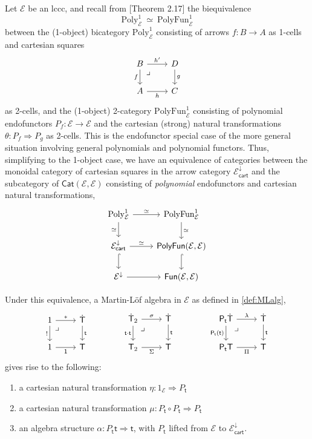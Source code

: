 \documentclass[12pt,reqno]{amsart}
\newcommand{\EE}{\ensuremath{\mathcal{E}}}
\newcommand{\Cat}{\ensuremath{\mathsf{Cat}}}
\newcommand{\alg}[1]{\ensuremath{\mathsf{#1}}}
\renewcommand{\to}{\ensuremath{\rightarrow}}
\renewcommand{\t}{\ensuremath{\mathsf{t}}}
\newcommand{\T}{\ensuremath{\mathsf{T}}}
\newcommand{\TT}{\ensuremath{\dot{\mathsf{T}}}}
\newcommand{\pbcorner}{\arrow[dr,phantom,"\lrcorner" very near start, shift right=.5ex]} %
\theoremstyle{remark}
\theoremstyle{definition}
\begin{document}
Let $\EE$ be an lccc, and recall from \cite{GK}[Theorem 2.17] the biequivalence 
\[
\mathrm{Poly}^1_{\EE}\ \simeq\ \mathrm{PolyFun}^1_{\EE}
\]
between the (1-object) bicategory $\mathrm{Poly}^1_{\EE}$ consisting of arrows $f:B \to A$ as 1-cells and cartesian squares
\[
\begin{tikzcd}
B \ar[d,swap, "f"] \ar[r, "{h'}"] \pbcorner & D \ar[d, "g"] \\
A \ar[r,swap, "{h}"] &  C 
\end{tikzcd}
\]
as 2-cells, and the (1-object) 2-category $\mathrm{PolyFun}^1_{\EE}$ consisting of polynomial endofunctors $P_f: \EE\to \EE$ and the cartesian (strong) natural transformations $\theta : P_f \Rightarrow P_g$ as 2-cells.  This is the endofunctor special case of the more general situation involving general polynomials and polynomial functors. Thus, simplifying to the 1-object case, we have an equivalence of categories between the monoidal category of cartesian squares in the arrow category $\EE^{\downarrow}_{\mathsf{cart}}$ and the subcategory of $\Cat(\EE, \EE)$ consisting of \emph{polynomial} endofunctors and cartesian natural transformations,
\[\begin{tikzcd}
\mathrm{Poly}^1_{\EE} \ar[d,swap, "{\simeq}"] \ar[r,"{\simeq}"] & \mathrm{PolyFun}^1_{\EE}  \ar[d, "{\simeq}"] \\
\EE^{\downarrow}_{\mathsf{cart}} \ar[d, hook] \ar[r,"{\simeq}"] & \mathsf{PolyFun}(\EE, \EE)  \ar[d, hook] \\
\EE^{\downarrow}  \ar[r] & \mathsf{Fun}(\EE, \EE)
\end{tikzcd}\]

Under this equivalence, a Martin-L\"of algebra in $\EE$ as defined in \ref{def:MLalg},
\begin{equation*}\label{diag:MLalg}
\begin{tikzcd}
	1 \ar[r,"*"] \ar[d,swap,"!"] \pbcorner &  \TT \ar[d, "\t"]\\  
	1 \ar[r, swap,"\mathsf{1}"] & \T
 \end{tikzcd}\qquad \qquad 
 \begin{tikzcd}
	\TT_2  \ar[r,"\sigma"] \ar[d,swap,"\t\cdot\t"] \pbcorner &  \TT \ar[d, "\t"]\\  
	\T_2 \ar[r,swap, "\Sigma"] & \T
\end{tikzcd} \qquad \qquad 
	 \begin{tikzcd}
	\alg{P}_\t\TT \ar[r,"\lambda"] \ar[d,swap,"\alg{P}_\t(\t)"] \pbcorner &  \TT \ar[d, "\t"]\\  
	\alg{P}_\t\T \ar[r,swap, "\Pi"] & \T
 \end{tikzcd} 
 \end{equation*}
gives rise to the following:
\begin{enumerate}
\item a cartesian natural transformation $\eta:1_\EE \Rightarrow P_\t$
\item a cartesian natural transformation $\mu:P_\t\circ P_\t \Rightarrow P_\t$
\item an algebra structure $\alpha:P_\t\t \Rightarrow \t$, with $P_\t$ lifted from $\EE$ to $\EE^{\downarrow}_{\mathsf{cart}}$.
\end{enumerate}
\end{document}
